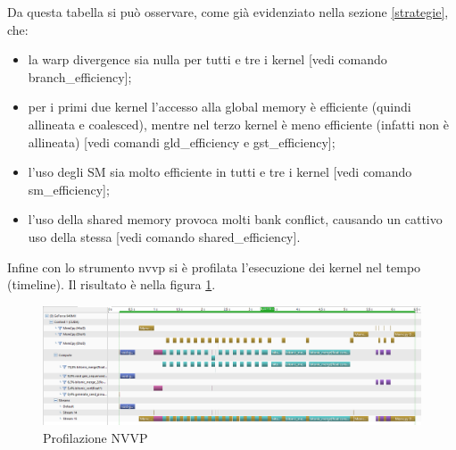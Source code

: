 \documentclass[a4paper, 11pt]{article}
\begin{document}
		Da questa tabella si può osservare, come già evidenziato nella sezione \ref{strategie}, che:
		\begin{itemize}
			\item la warp divergence sia nulla per tutti e tre i kernel [vedi comando branch\_efficiency];
			\item per i primi due kernel l'accesso alla global memory è efficiente (quindi allineata e coalesced), 
				mentre nel terzo kernel è meno efficiente (infatti non è allineata) [vedi comandi gld\_efficiency e gst\_efficiency];
			\item l'uso degli SM sia molto efficiente in tutti e tre i kernel [vedi comando sm\_efficiency];
			\item l'uso della shared memory provoca molti bank conflict, causando un cattivo uso della stessa [vedi comando shared\_efficiency].
		\end{itemize}
		
		Infine con lo strumento nvvp si è profilata l'esecuzione dei kernel nel tempo (timeline). Il risultato è nella figura \ref{fig:nvvp}.
		
		\begin{figure}
			\centering
			\includegraphics[width=0.99\linewidth]{img/nvvp}
			\caption{Profilazione NVVP}
			\label{fig:nvvp}
		\end{figure}
		
\end{document}
